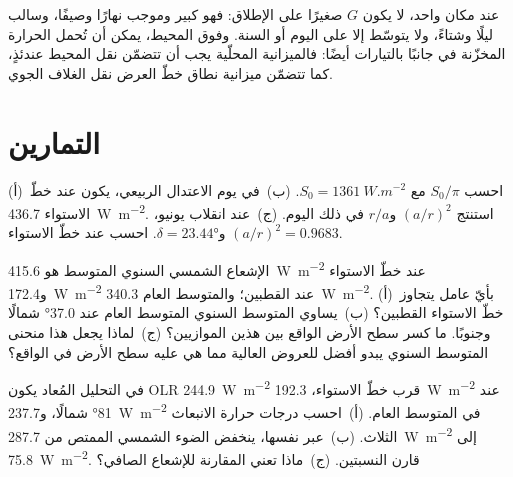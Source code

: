\begin{remark}\label{rem:b1:radiation-heat-transport:local}
عند مكان واحد، لا يكون $G$ صغيرًا على الإطلاق: فهو كبير وموجب نهارًا وصيفًا، وسالب ليلًا وشتاءً، ولا يتوسّط إلا على اليوم أو السنة. وفوق المحيط، يمكن أن تُحمل الحرارة المخزّنة في  جانبًا بالتيارات أيضًا: فالميزانية المحلّية يجب أن تتضمّن نقل المحيط عندئذٍ، كما تتضمّن ميزانية نطاق خطّ العرض نقل الغلاف الجوي.
\end{remark}

\section{التمارين}

\begin{exercise}[$\star$]\label{exo:b1:radiation-heat-transport:1}
(أ)~احسب $S_0/\pi$ مع $S_0 = \qty{1361}{W.m^{-2}}$. (ب)~في يوم الاعتدال الربيعي، يكون  عند خطّ الاستواء \qty{436.7}{W.m^{-2}}. استنتج $(a/r)^2$ و$r/a$ في ذلك اليوم. (ج)~عند انقلاب يونيو، $(a/r)^2 = 0.9683$ و$\delta = \ang{23.44}$. احسب  عند خطّ الاستواء.
\end{exercise}

\begin{exercise}[$\star$]\label{exo:b1:radiation-heat-transport:2}
الإشعاع الشمسي السنوي المتوسط هو \qty{415.6}{W.m^{-2}} عند خطّ الاستواء و\qty{172.4}{W.m^{-2}} عند القطبين؛ والمتوسط العام \qty{340.3}{W.m^{-2}}. (أ)~بأيّ عامل يتجاوز خطّ الاستواء القطبين؟ (ب)~يساوي المتوسط السنوي المتوسط العام عند \ang{37.0} شمالًا وجنوبًا. ما كسر سطح الأرض الواقع بين هذين الموازيين؟ (ج)~لماذا يجعل هذا منحنى المتوسط السنوي يبدو أفضل للعروض العالية مما هي عليه سطح الأرض في الواقع؟
\end{exercise}

\begin{exercise}[$\star$]\label{exo:b1:radiation-heat-transport:3}
في التحليل المُعاد يكون OLR \qty{244.9}{W.m^{-2}} قرب خطّ الاستواء،
\qty{192.3}{W.m^{-2}} عند \ang{81} شمالًا، و\qty{237.7}{W.m^{-2}} في المتوسط العام. (أ)~احسب درجات حرارة الانبعاث الثلاث. (ب)~عبر  نفسها، ينخفض الضوء الشمسي الممتص من \qty{287.7}{W.m^{-2}} إلى \qty{75.8}{W.m^{-2}}. قارن النسبتين. (ج)~ماذا تعني المقارنة للإشعاع الصافي؟
\end{exercise}

